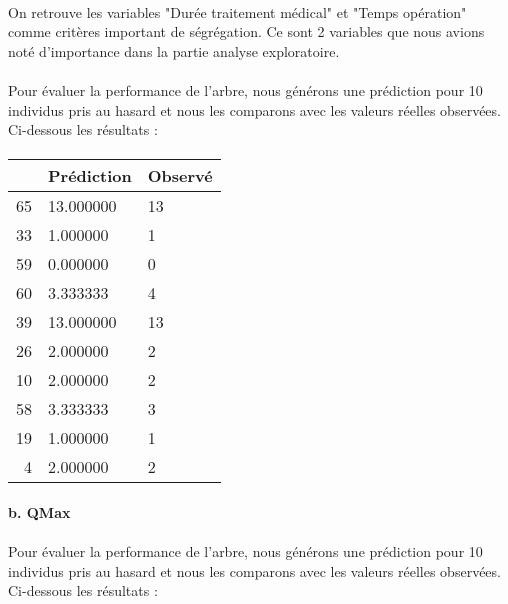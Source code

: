 \documentclass[11pt]{article}
\begin{document}
\paragraph{}
On retrouve les variables "Durée traitement médical" et "Temps
opération" comme critères important de ségrégation. Ce sont 2 variables
que nous avions noté d'importance dans la partie analyse exploratoire.
\paragraph{}
    Pour évaluer la performance de l'arbre, nous générons une prédiction
pour 10 individus pris au hasard et nous les comparons avec les valeurs
réelles observées. Ci-dessous les résultats :

\paragraph{}

    \begin{tabular}{r|ll}
  & Prédiction & Observé\\
\hline
	65 & 13.000000 & 13       \\
	33 &  1.000000 &  1       \\
	59 &  0.000000 &  0       \\
	60 &  3.333333 &  4       \\
	39 & 13.000000 & 13       \\
	26 &  2.000000 &  2       \\
	10 &  2.000000 &  2       \\
	58 &  3.333333 &  3       \\
	19 &  1.000000 &  1       \\
	4 &  2.000000 &  2       \\
\end{tabular}
    
    \paragraph{b. QMax}\label{b.-qmax}



    \begin{center}
    \end{center}
    
    
\paragraph{}Pour évaluer la performance de l'arbre, nous générons une prédiction
pour 10 individus pris au hasard et nous les comparons avec les valeurs
réelles observées. Ci-dessous les résultats :
\end{document}
